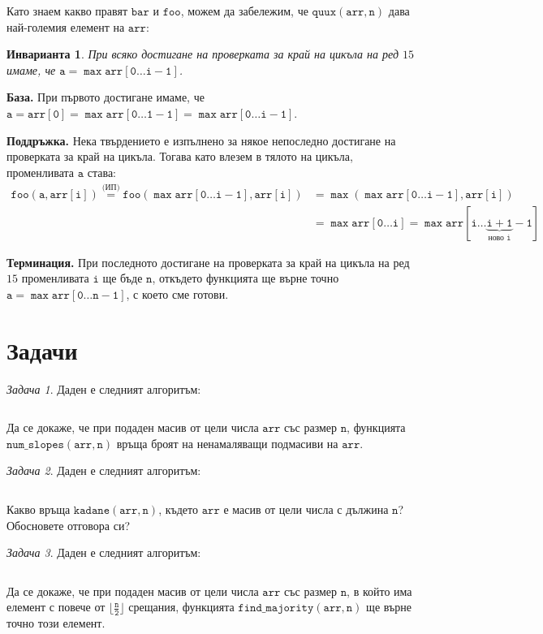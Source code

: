 \documentclass{article}
\theoremstyle{definition}
\theoremstyle{plain}
\newtheorem*{invariant}{Инварианта}
\theoremstyle{remark}
\newtheorem{problem}{Задача}
\theoremstyle{definition}
\begin{document}
Като знаем какво правят $\mathtt{bar}$ и $\mathtt{foo}$, можем да забележим, че $\mathtt{quux(arr, n)}$ дава най-големия елемент на $\mathtt{arr}$:
\begin{invariant}
    При всяко достигане на проверката за край на цикъла на ред $15$ имаме, че $\mathtt{a = \max arr[0 \dots i - 1]}$.
\end{invariant}

\textbf{База.}
При първото достигане имаме, че $\mathtt{a = arr[0] = \max arr[0 \dots 1 - 1] = \max arr[0 \dots i - 1]}$.

\textbf{Поддръжка.}
Нека твърдението е изпълнено за някое непоследно достигане на проверката за край на цикъла.
Тогава като влезем в тялото на цикъла, променливата $\mathtt{a}$ става:
\begin{align*}
    \mathtt{foo(a, arr[i]) \stackrel{\text{(ИП)}}{=} foo(\max arr[0 \dots i - 1], arr[i])} & = \mathtt{\max (\max arr[0 \dots i - 1], arr[i])}                                                  \\
                                                                                           & =\mathtt{\max arr[0 \dots i] = \max arr[i \dots \underbrace{\mathtt{i + 1}}_{\text{ново } i} - 1]}
\end{align*}

\textbf{Терминация.}
При последното достигане на проверката за край на цикъла на ред $15$ променливата $\mathtt{i}$ ще бъде $\mathtt{n}$, откъдето функцията ще върне точно $\mathtt{a = \max arr[0 \dots n - 1]}$, с което сме готови.

\section*{Задачи}

\begin{problem}
Даден е следният алгоритъм:
\inputminted[linenos]{c++}{algorithms/num_slopes.cpp}

Да се докаже, че при подаден масив от цели числа $\mathtt{arr}$ със размер $\mathtt{n}$, функцията $\mathtt{num\_slopes(arr, n)}$ връща броят на ненамаляващи подмасиви на $\mathtt{arr}$.
\end{problem}


\begin{problem}
Даден е следният алгоритъм:
\inputminted[linenos]{c++}{algorithms/kadane.cpp}

Какво връща $\mathtt{kadane(arr, n)}$, където $\mathtt{arr}$ е масив от цели числа с дължина $\mathtt{n}$?
Обосновете отговора си?
\end{problem}

\begin{problem}
Даден е следният алгоритъм:
\inputminted[linenos]{c++}{algorithms/find_majority.cpp}

Да се докаже, че при подаден масив от цели числа $\mathtt{arr}$ със размер $\mathtt{n}$, в който има елемент с повече от $\mathtt{\lfloor \frac{n}{2} \rfloor}$ срещания,
функцията $\mathtt{find\_majority(arr, n)}$ ще върне точно този елемент.
\end{problem}
\end{document}
